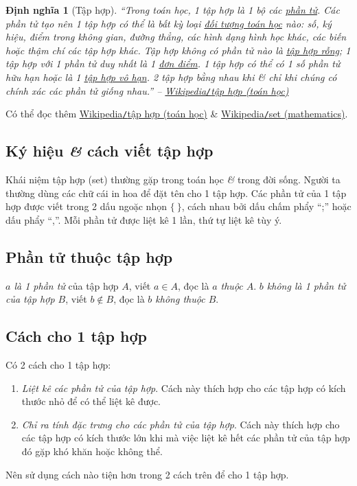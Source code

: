\documentclass[oneside]{book}
\numberwithin{equation}{section}
\newtheorem{dinhnghia}{Định nghĩa}[section]
\begin{document}
\begin{dinhnghia}[Tập hợp]
	``Trong toán học, 1 \textit{tập hợp} là 1 bộ các \href{https://vi.wikipedia.org/wiki/Ph%E1%BA%A7n_t%E1%BB%AD_(to%C3%A1n_h%E1%BB%8Dc)}{phần tử}. Các phần tử tạo nên 1 tập hợp có thể là bất kỳ loại \href{https://vi.wikipedia.org/wiki/%C4%90%E1%BB%91i_t%C6%B0%E1%BB%A3ng_to%C3%A1n_h%E1%BB%8Dc}{đối tượng toán học} nào: số, ký hiệu, điểm trong không gian, đường thẳng, các hình dạng hình học khác, các biến hoặc thậm chí các tập hợp khác. Tập hợp không có phần tử nào là \href{https://vi.wikipedia.org/wiki/T%E1%BA%ADp_h%E1%BB%A3p_r%E1%BB%97ng}{tập hợp rỗng}; 1 tập hợp với 1 phần tử duy nhất là 1 \href{https://vi.wikipedia.org/wiki/%C4%90%C6%A1n_%C4%91i%E1%BB%83m_(to%C3%A1n_h%E1%BB%8Dc)}{đơn điểm}. 1 tập hợp có thể có 1 số phần tử hữu hạn hoặc là 1 \href{https://vi.wikipedia.org/wiki/T%E1%BA%ADp_h%E1%BB%A3p_v%C3%B4_h%E1%BA%A1n}{tập hợp vô hạn}. 2 tập hợp bằng nhau khi \& chỉ khi chúng có chính xác các phần tử giống nhau.'' -- \href{https://vi.wikipedia.org/wiki/T%E1%BA%ADp_h%E1%BB%A3p_(to%C3%A1n_h%E1%BB%8Dc)}{Wikipedia\emph{\texttt{/}}tập hợp (toán học)}
\end{dinhnghia}
Có thể đọc thêm \href{https://vi.wikipedia.org/wiki/T%E1%BA%ADp_h%E1%BB%A3p_(to%C3%A1n_h%E1%BB%8Dc)}{Wikipedia\texttt{/}tập hợp (toán học)} \& \href{https://en.wikipedia.org/wiki/Set_(mathematics)}{Wikipedia\texttt{/}set (mathematics)}.

\subsection{Ký hiệu \textit{\&} cách viết tập hợp}
Khái niệm tập hợp (set) thường gặp trong toán học \textit{\&} trong đời sống. Người ta thường dùng các chữ cái in hoa để đặt tên cho 1 tập hợp. Các phần tử của 1 tập hợp được viết trong 2 dấu ngoặc nhọn $\{\ \}$, cách nhau bởi dấu chấm phẩy ``;'' hoặc dấu phẩy ``,''. Mỗi phần tử được liệt kê 1 lần, thứ tự liệt kê tùy ý.

\subsection{Phần tử thuộc tập hợp}
\textit{$a$ là 1 phần tử} của tập hợp $A$, viết $a\in A$, đọc là \textit{$a$ thuộc $A$}. \textit{$b$ không là 1 phần tử của tập hợp $B$}, viết $b\notin B$, đọc là \textit{$b$ không thuộc $B$}.

\subsection{Cách cho 1 tập hợp}
Có 2 cách cho 1 tập hợp:
\begin{enumerate}
	\item \textit{Liệt kê các phần tử của tập hợp}. Cách này thích hợp cho các tập hợp có kích thước nhỏ để có thể liệt kê được.
	\item \textit{Chỉ ra tính đặc trưng cho các phần tử của tập hợp}. Cách này thích hợp cho các tập hợp có kích thước lớn khi mà việc liệt kê hết các phần tử của tập hợp đó gặp khó khăn hoặc không thể. 
\end{enumerate}
Nên sử dụng cách nào tiện hơn trong 2 cách trên để cho 1 tập hợp.
\end{document}
